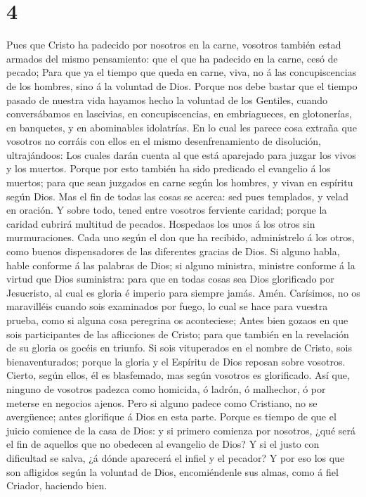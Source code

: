 \hypertarget{section-3}{%
\section{4}\label{section-3}}

 Pues que Cristo ha padecido por nosotros en la carne,
vosotros también estad armados del mismo pensamiento: que el que ha
padecido en la carne, cesó de pecado;  Para que ya el tiempo
que queda en carne, viva, no á las concupiscencias de los hombres, sino
á la voluntad de Dios.  Porque nos debe bastar que el tiempo
pasado de nuestra vida hayamos hecho la voluntad de los Gentiles, cuando
conversábamos en lascivias, en concupiscencias, en embriagueces, en
glotonerías, en banquetes, y en abominables idolatrías.  En
lo cual les parece cosa extraña que vosotros no corráis con ellos en el
mismo desenfrenamiento de disolución, ultrajándoos:  Los
cuales darán cuenta al que está aparejado para juzgar los vivos y los
muertos.  Porque por esto también ha sido predicado el
evangelio á los muertos; para que sean juzgados en carne según los
hombres, y vivan en espíritu según Dios.  Mas el fin de
todas las cosas se acerca: sed pues templados, y velad en oración.
 Y sobre todo, tened entre vosotros ferviente caridad;
porque la caridad cubrirá multitud de pecados.  Hospedaos
los unos á los otros sin murmuraciones.  Cada uno según el
don que ha recibido, adminístrelo á los otros, como buenos dispensadores
de las diferentes gracias de Dios.  Si alguno habla, hable
conforme á las palabras de Dios; si alguno ministra, ministre conforme á
la virtud que Dios suministra: para que en todas cosas sea Dios
glorificado por Jesucristo, al cual es gloria é imperio para siempre
jamás. Amén.  Carísimos, no os maravilléis cuando sois
examinados por fuego, lo cual se hace para vuestra prueba, como si
alguna cosa peregrina os aconteciese;  Antes bien gozaos en
que sois participantes de las aflicciones de Cristo; para que también en
la revelación de su gloria os gocéis en triunfo.  Si sois
vituperados en el nombre de Cristo, sois bienaventurados; porque la
gloria y el Espíritu de Dios reposan sobre vosotros. Cierto, según
ellos, él es blasfemado, mas según vosotros es glorificado.
 Así que, ninguno de vosotros padezca como homicida, ó
ladrón, ó malhechor, ó por meterse en negocios ajenos. 
Pero si alguno padece como Cristiano, no se avergüence; antes glorifique
á Dios en esta parte.  Porque es tiempo de que el juicio
comience de la casa de Dios: y si primero comienza por nosotros, ¿qué
será el fin de aquellos que no obedecen al evangelio de Dios?
 Y si el justo con dificultad se salva, ¿á dónde aparecerá
el infiel y el pecador?  Y por eso los que son afligidos
según la voluntad de Dios, encomiéndenle sus almas, como á fiel Criador,
haciendo bien.

